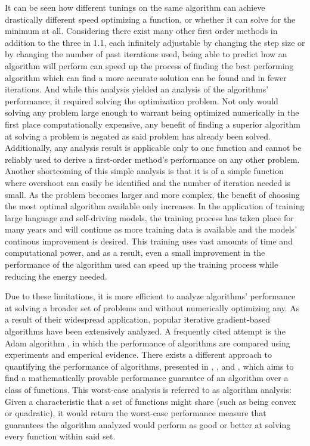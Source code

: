 It can be seen how different tunings on the same algorithm can achieve drastically different speed optimizing a function, or whether it can solve for the minimum at all. Considering there exist many other first order methods in addition to the three in 1.1, each infinitely adjustable by changing the step size or by changing the number of past iterations used, being able to predict how an algorithm will perform can speed up the process of finding the best performing algorithm which can find a more accurate solution can be found and in fewer iterations. And while this analysis yielded an analysis of the algorithms' performance, it required solving the optimization problem. Not only would solving any problem large enough to warrant being optimized numerically in the first place computationally expensive, any benefit of finding a superior algorithm at solving a problem is negated as said problem has already been solved. Additionally, any analysis result is applicable only to one function and cannot be reliably used to derive a first-order method's performance on any other problem. Another shortcoming of this simple analysis is that it is of a simple function where overshoot can easily be identified and the number of iteration needed is small. As the problem becomes larger and more complex, the benefit of choosing the most optimal algorithm available only increases. In the application of training large language and self-driving models, the training process has taken place for many years and will continue as more training data is available and the models' continous improvement is desired. This training uses vast amounts of time and computational power, and as a result, even a small improvement in the performance of the algorithm used can speed up the training process while reducing the energy needed.

Due to these limitations, it is more efficient to analyze algorithms' performance at solving a broader set of problems and without numerically optimizing any. As a result of their widespread application, popular iterative gradient-based algorithms have been extensively analyzed. A frequently cited attempt is the Adam algorithm \cite{adam}, in which the performance of algorithms are compared using experiments and emperical evidence. There exists a different approach to quantifying the performance of algorithms, presented in \cite{drori2012}, \cite{taylor2016}, and \cite{lessard2016}, which aims to find a mathematically provable performance guarantee of an algorithm over a class of functions. This worst-case analysis is referred to as algorithm analysis: Given a characteristic that a set of functions might share (such as being convex or quadratic), it would return the worst-case performance measure that guarantees the algorithm analyzed would perform as good or better at solving every function within said set.

